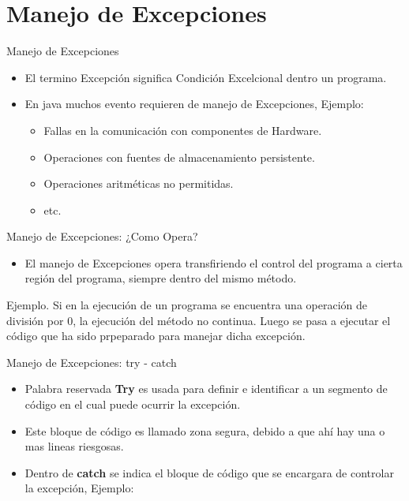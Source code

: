 \section{Manejo de Excepciones}
\begin{frame}{Manejo de Excepciones}
\begin{itemize}
	\item El termino Excepci\'on significa Condici\'on Excelcional dentro un programa.
	\item En java muchos evento requieren de manejo de Excepciones, Ejemplo:
	\begin{itemize}
			\item Fallas en la comunicaci\'on con componentes de Hardware.
			\item Operaciones con fuentes de almacenamiento persistente.
			\item Operaciones aritm\'eticas no permitidas.
			\item etc.
	\end{itemize}
\end{itemize}
\end{frame}

\begin{frame}{Manejo de Excepciones: ¿Como Opera?}
\begin{itemize}
	\item El manejo de Excepciones opera transfiriendo el control del programa a cierta regi\'on del programa, siempre
	dentro del mismo m\'etodo.
\end{itemize}
\begin{block}{Ejemplo.}
	Si en la ejecuci\'on de un programa se encuentra una operaci\'on de divisi\'on por 0, la ejecuci\'on del m\'etodo no continua. Luego
	se pasa a ejecutar el c\'odigo que ha sido prpeparado para manejar dicha excepci\'on.
	\end{block}
\end{frame}

\begin{frame}{Manejo de Excepciones: try - catch}
\begin{itemize}
	\item Palabra reservada \textbf{Try} es usada para definir e identificar a un segmento de c\'odigo en el cual puede ocurrir la excepci\'on.
	\item Este bloque de c\'odigo es llamado zona segura, debido a que ah\'i hay una o mas lineas riesgosas.
	\item Dentro de \textbf{catch} se indica el bloque de c\'odigo que se encargara de controlar la excepci\'on, Ejemplo:
\end{itemize}
\end{frame}

